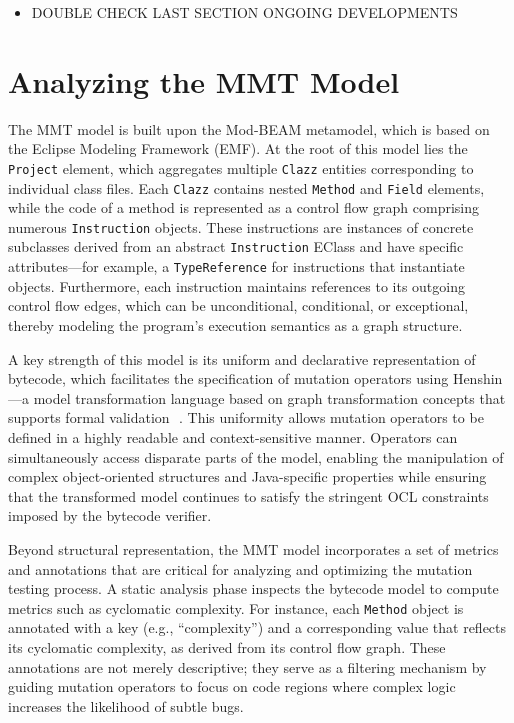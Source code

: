 \documentclass[sigplan, nonacm]{acmart}
\begin{document}
\begin{itemize}
    \item DOUBLE CHECK LAST SECTION ONGOING DEVELOPMENTS
\end{itemize}

\section{Analyzing the MMT Model}

The MMT model is built upon the Mod-BEAM metamodel, which is based on the Eclipse Modeling Framework (EMF). At the root of this model lies the \texttt{Project} element, which aggregates multiple \texttt{Clazz} entities corresponding to individual class files. Each \texttt{Clazz} contains nested \texttt{Method} and \texttt{Field} elements, while the code of a method is represented as a control flow graph comprising numerous \texttt{Instruction} objects. These instructions are instances of concrete subclasses derived from an abstract \texttt{Instruction} EClass and have specific attributes—for example, a \texttt{TypeReference} for instructions that instantiate objects. Furthermore, each instruction maintains references to its outgoing control flow edges, which can be unconditional, conditional, or exceptional, thereby modeling the program’s execution semantics as a graph structure.

A key strength of this model is its uniform and declarative representation of bytecode, which facilitates the specification of mutation operators using Henshin—a model transformation language based on graph transformation concepts that supports formal validation ​
. This uniformity allows mutation operators to be defined in a highly readable and context-sensitive manner. Operators can simultaneously access disparate parts of the model, enabling the manipulation of complex object-oriented structures and Java-specific properties while ensuring that the transformed model continues to satisfy the stringent OCL constraints imposed by the bytecode verifier.

Beyond structural representation, the MMT model incorporates a set of metrics and annotations that are critical for analyzing and optimizing the mutation testing process. A static analysis phase inspects the bytecode model to compute metrics such as cyclomatic complexity. For instance, each \texttt{Method} object is annotated with a key (e.g., “complexity”) and a corresponding value that reflects its cyclomatic complexity, as derived from its control flow graph. These annotations are not merely descriptive; they serve as a filtering mechanism by guiding mutation operators to focus on code regions where complex logic increases the likelihood of subtle bugs.
\end{document}
